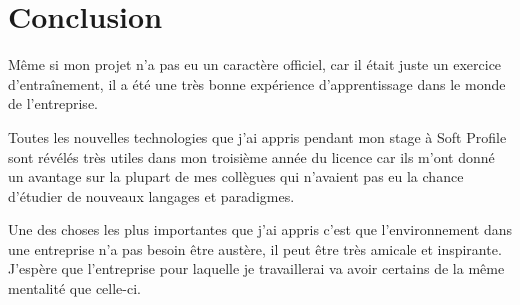 \documentclass[a4paper,10pt]{report}
\begin{document}
\chapter*{Conclusion}

Même si mon projet n'a pas eu un caractère officiel, car il était juste un exercice d'entraînement,
il a été une très bonne expérience d'apprentissage dans le monde de l'entreprise.

Toutes les nouvelles technologies que j'ai appris pendant mon stage à Soft Profile sont
révélés très utiles dans mon troisième année du licence car ils m'ont donné un avantage
sur la plupart de mes collègues qui n'avaient pas eu la chance d'étudier de nouveaux langages et paradigmes.

Une des choses les plus importantes que j'ai appris c'est que l'environnement dans
une entreprise n'a pas besoin être austère, il peut être très amicale et inspirante.
J'espère que l'entreprise pour laquelle je travaillerai va avoir certains de la même
mentalité que celle-ci.
\end{document}
